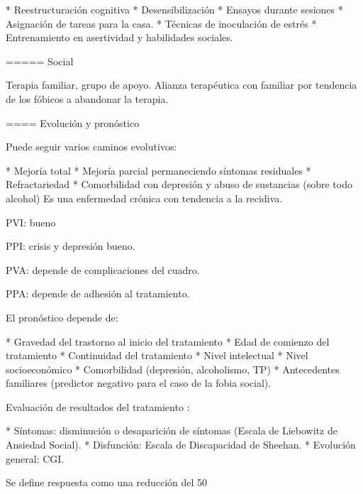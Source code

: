 * Reestructuración cognitiva
* Desensibilización
* Ensayos durante sesiones
* Asignación de tareas para la casa.
* Técnicas de inoculación de estrés
* Entrenamiento en asertividad y habilidades sociales.

===== Social

Terapia familiar, grupo de apoyo. Alianza terapéutica con familiar por tendencia de los fóbicos a abandonar la terapia.

==== Evolución y pronóstico

Puede seguir varios caminos evolutivos:

* Mejoría total
* Mejoría parcial permaneciendo síntomas residuales
* Refractariedad
* Comorbilidad con depresión y abuso de sustancias (sobre todo alcohol) Es una enfermedad crónica con tendencia a la recidiva.

PVI: bueno

PPI: crisis y depresión bueno.

PVA: depende de complicaciones del cuadro.

PPA: depende de adhesión al tratamiento.

El pronóstico depende de:

* Gravedad del trastorno al inicio del tratamiento
* Edad de comienzo del tratamiento
* Continuidad del tratamiento
* Nivel intelectual
* Nivel socioeconómico
* Comorbilidad (depresión, alcoholismo, TP)
* Antecedentes familiares (predictor negativo para el caso de la fobia social).

Evaluación de resultados del tratamiento :

* Síntomas: disminución o desaparición de síntomas (Escala de Liebowitz de Ansiedad Social).
* Disfunción: Escala de Discapacidad de Sheehan.
* Evolución general: CGI.

Se define respuesta como una reducción del 50%
